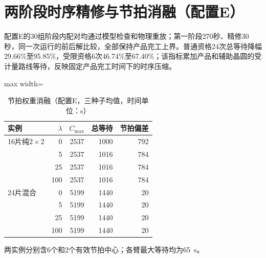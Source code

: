 \section{两阶段时序精修与节拍消融（配置E）}\label{sec:stage2-validation-cn}
配置E的30组阶段内配对均通过模型检查和物理重放；第一阶段270秒、精修30秒，同一次运行的前后解比较，全部保持产品完工上界。普通资格24次总等待降幅29.66\%至95.85\%，受限资格6次46.74\%至67.40\%；该指标累加产品和辅助晶圆的受计量路线等待，反映固定产品完工时间下的时序压缩。
\begin{table}[!htbp]
\centering\small
\caption{配置E同一排程的时序精修（三种子均值，单位：s）}
\label{tab:refinement-ablation-cn}
\end{table}
\begin{table}[!htbp]
\centering\small
\caption{节拍权重消融（配置E，三种子均值，时间单位：s）}
\label{tab:rhythm-weight-cn}
\begin{adjustbox}{max width=\linewidth}
\begin{tabular}{lrrrr}\toprule
实例 & $\lambda$ & $C_{\max}$ & 总等待 & 节拍偏差\\\midrule
16片纯$2\times2$ & 0 & 2537 & 1000 & 792\\
 & 5 & 2537 & 1016 & 784\\
 & 25 & 2537 & 1016 & 784\\
 & 100 & 2537 & 1016 & 784\\
24片混合 & 0 & 5199 & 1440 & 20\\
 & 5 & 5199 & 1440 & 20\\
 & 25 & 5199 & 1440 & 20\\
 & 100 & 5199 & 1440 & 20\\
\bottomrule\end{tabular}
\end{adjustbox}
\par\smallskip\footnotesize 两实例分别含6个和2个有效节拍中心；各臂最大等待均为65~s。
\end{table}
